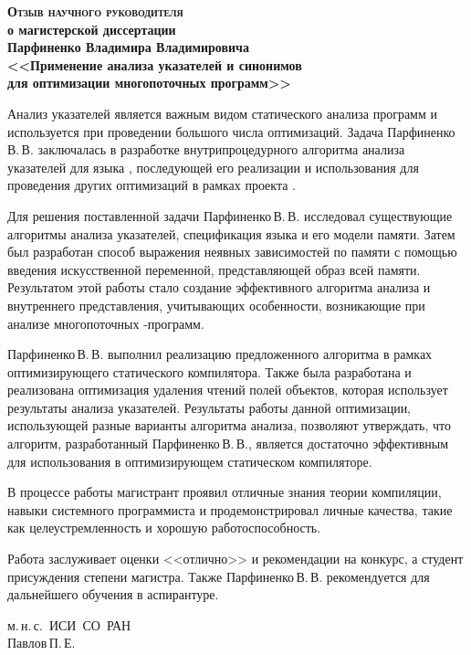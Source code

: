 \documentclass[12pt]{article}
\newcommand\he{Парфиненко\,В.\,В.}
\begin{document}
  \thispagestyle{empty}

  \begin{center}
    \bfseries
    {\Large \scshape Отзыв научного руководителя}\\
    о магистерской диссертации\\
    Парфиненко Владимира Владимировича\\
    {\large
      <<Применение анализа указателей и синонимов\\
      для оптимизации многопоточных программ>>\\
    }
  \end{center}

  Анализ указателей является важным видом статического анализа программ и
  используется при проведении большого числа оптимизаций.
  Задача \he{} заключалась в разработке внутрипроцедурного алгоритма анализа
  указателей для языка , последующей его реализации и использования
  для проведения других оптимизаций в рамках проекта .

  Для решения поставленной задачи \he{} исследовал существующие алгоритмы
  анализа указателей, спецификация языка  и его модели памяти.
  Затем был разработан способ выражения неявных зависимостей по памяти с
  помощью введения искусственной переменной, представляющей образ всей памяти.
  Результатом этой работы стало создание эффективного алгоритма анализа и
  внутреннего представления, учитывающих особенности, возникающие при анализе
  многопоточных -программ.

  \he{} выполнил реализацию предложенного алгоритма в рамках оптимизирующего
  статического компилятора.
  Также была разработана и реализована оптимизация удаления чтений полей
  объектов, которая использует результаты анализа указателей.
  Результаты работы данной оптимизации, использующей разные варианты алгоритма
  анализа, позволяют утверждать, что алгоритм, разработанный \he{}, является
  достаточно эффективным для использования в оптимизирующем статическом
  компиляторе.

  В процессе работы магистрант проявил отличные знания теории компиляции,
  навыки системного программиста и продемонстрировал личные качества, такие как
  целеустремленность и хорошую работоспособность.

  Работа заслуживает оценки <<отлично>> и рекомендации на конкурс, а студент
  присуждения степени магистра.
  Также \he{} рекомендуется для дальнейшего обучения в аспирантуре.

  \begin{flushright}
    м.\,н.\,с.~ИСИ~СО~РАН\\
    Павлов\,П.\,Е.
  \end{flushright}
\end{document}
